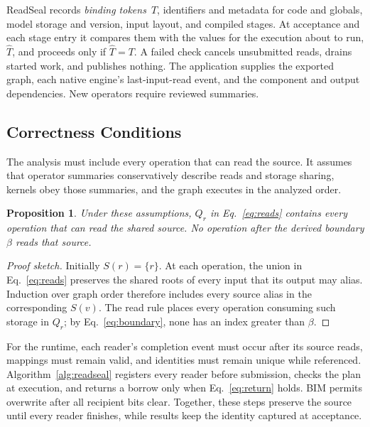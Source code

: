\documentclass[conference]{IEEEtran}
\newtheorem{proposition}{Proposition}
\begin{document}
ReadSeal records \emph{binding tokens}~$T$, identifiers and metadata for code and globals, model storage and version, input layout, and compiled stages. At acceptance and each stage entry it compares them with the values for the execution about to run, $\hat T$, and proceeds only if $\hat T=T$. A failed check cancels unsubmitted reads, drains started work, and publishes nothing. The application supplies the exported graph, each native engine's last-input-read event, and the component and output dependencies. New operators require reviewed summaries.

\subsection{Correctness Conditions}
\label{sec:correctness}

The analysis must include every operation that can read the source. It assumes that operator summaries conservatively describe reads and storage sharing, kernels obey those summaries, and the graph executes in the analyzed order.

\begin{proposition}
Under these assumptions, $Q_r$ in Eq.~\eqref{eq:reads} contains every operation that can read the shared source. No operation after the derived boundary $\beta$ reads that source.
\end{proposition}

\begin{proof}[Proof sketch]
Initially $S(r)=\{r\}$. At each operation, the union in Eq.~\eqref{eq:reads} preserves the shared roots of every input that its output may alias. Induction over graph order therefore includes every source alias in the corresponding $S(v)$. The read rule places every operation consuming such storage in $Q_r$; by Eq.~\eqref{eq:boundary}, none has an index greater than $\beta$.
\end{proof}

For the runtime, each reader's completion event must occur after its source reads, mappings must remain valid, and identities must remain unique while referenced. Algorithm~\ref{alg:readseal} registers every reader before submission, checks the plan at execution, and returns a borrow only when Eq.~\eqref{eq:return} holds. BIM permits overwrite after all recipient bits clear. Together, these steps preserve the source until every reader finishes, while results keep the identity captured at acceptance.

\end{document}
